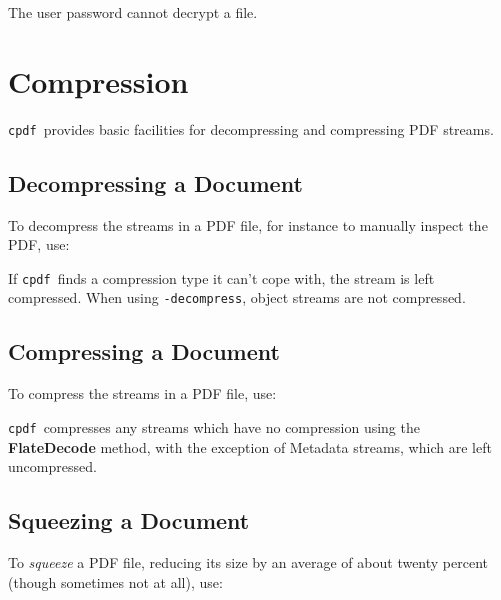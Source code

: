 \documentclass{book}
\newcommand{\cpdf}{\texttt{cpdf}}
\begin{document}
\noindent{}
  \noindent The user password cannot decrypt a file.

\chapter{Compression}

\noindent{}
  \cpdf\ provides basic facilities for decompressing and compressing PDF streams.
  \section{Decompressing a Document}
  To decompress the streams in a PDF file, for instance to manually inspect the
PDF, use:

\noindent{}
  \noindent If \cpdf\ finds a compression type it can't cope with, the stream is left compressed. When using \texttt{-decompress}, object streams are not compressed.
  \section{Compressing a Document}
  To compress the streams in a PDF file, use:

\noindent{}
  \noindent\cpdf\ compresses any streams which have no compression using the
  \textbf{Flate\-Decode} method, with the exception of Metadata streams, which
  are left uncompressed.
  
  \section{Squeezing a Document}
  To \textit{squeeze} a PDF file, reducing its size by an average of about twenty percent (though sometimes not at all), use:
\end{document}
